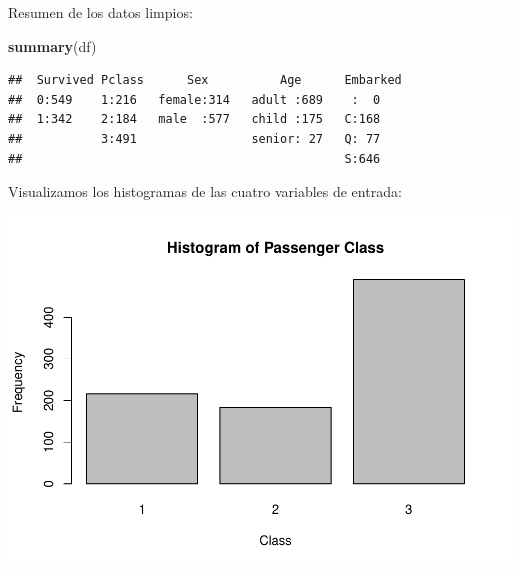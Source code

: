\documentclass[]{article}
\newenvironment{Shaded}{\begin{snugshade}}{\end{snugshade}}
\newcommand{\KeywordTok}[1]{\textcolor[rgb]{0.13,0.29,0.53}{\textbf{#1}}}
\newcommand{\DataTypeTok}[1]{\textcolor[rgb]{0.13,0.29,0.53}{#1}}
\newcommand{\StringTok}[1]{\textcolor[rgb]{0.31,0.60,0.02}{#1}}
\newcommand{\OperatorTok}[1]{\textcolor[rgb]{0.81,0.36,0.00}{\textbf{#1}}}
\newcommand{\NormalTok}[1]{#1}
\begin{document}
Resumen de los datos limpios:

\begin{Shaded}
\begin{Highlighting}[]
\KeywordTok{summary}\NormalTok{(df)}
\end{Highlighting}
\end{Shaded}

\begin{verbatim}
##  Survived Pclass      Sex          Age      Embarked
##  0:549    1:216   female:314   adult :689    :  0   
##  1:342    2:184   male  :577   child :175   C:168   
##           3:491                senior: 27   Q: 77   
##                                             S:646
\end{verbatim}

Visualizamos los histogramas de las cuatro variables de entrada:

\begin{Shaded}
\end{Shaded}

\includegraphics{titanicDataClean_files/figure-latex/unnamed-chunk-11-1.pdf}

\begin{Shaded}
\end{Shaded}
\end{document}
